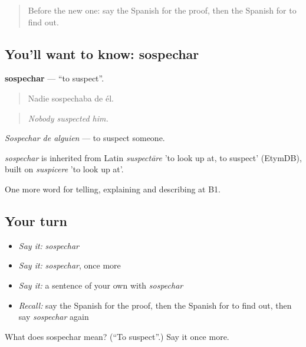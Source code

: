 \label{lesson:ES-C521-sospechar}



\begin{quote}
Before the new one: say the Spanish for the proof, then the Spanish for to find out.
\end{quote}

\subsection*{You'll want to know: sospechar}
\textbf{sospechar} — \textquotedblleft{}to suspect\textquotedblright{}.

\begin{quote}
Nadie sospechaba de él.
\end{quote}

\begin{quote}
\emph{Nobody suspected him.}
\end{quote}

\emph{Sospechar de alguien} — to suspect someone.

\begin{cousinweb}
\emph{sospechar} is inherited from Latin \emph{suspectāre} 'to look up at, to suspect' (EtymDB), built on \emph{suspicere} 'to look up at'.
\end{cousinweb}

\begin{grammarlens}[title={What you've built}]
One more word for telling, explaining and describing at B1.
\end{grammarlens}

\subsection*{Your turn}
\begin{itemize}
\raggedright
  \item \emph{Say it:} \emph{sospechar}
  \item \emph{Say it:} \emph{sospechar}, once more
  \item \emph{Say it:} a sentence of your own with \emph{sospechar}
  \item \emph{Recall:} say the Spanish for the proof, then the Spanish for to find out, then say \emph{sospechar} again
\end{itemize}

\begin{tcolorbox}[breakable,colback=teal!4,colframe=teal!35!black,title={Before you move on}]
What does sospechar mean? (\textquotedblleft{}To suspect\textquotedblright{}.) Say it once more.
\end{tcolorbox}
